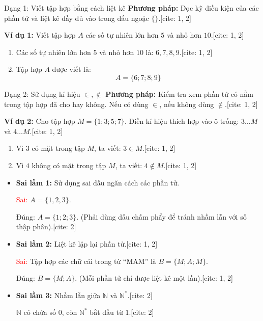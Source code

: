 \documentclass[12pt,a4paper]{article}
\begin{document}
\begin{vidubox}{Dạng 1: Viết tập hợp bằng cách liệt kê}
\textbf{Phương pháp:} Đọc kỹ điều kiện của các phần tử và liệt kê đầy đủ vào trong dấu ngoặc $\{ \}$.[cite: 1, 2]

\textbf{Ví dụ 1:} Viết tập hợp $A$ các số tự nhiên lớn hơn $5$ và nhỏ hơn $10$.[cite: 1, 2]
\begin{enumerate}
    \item Các số tự nhiên lớn hơn $5$ và nhỏ hơn $10$ là: $6, 7, 8, 9$.[cite: 1, 2]
    \item Tập hợp $A$ được viết là:
    $$A = \{6; 7; 8; 9\}$$
\end{enumerate}
\end{vidubox}

\begin{vidubox}{Dạng 2: Sử dụng kí hiệu $\in, \notin$}
\textbf{Phương pháp:} Kiểm tra xem phần tử có nằm trong tập hợp đã cho hay không. Nếu có dùng $\in$, nếu không dùng $\notin$.[cite: 1, 2]

\textbf{Ví dụ 2:} Cho tập hợp $M = \{1; 3; 5; 7\}$. Điền kí hiệu thích hợp vào ô trống: $3 \dots M$ và $4 \dots M$.[cite: 1, 2]
\begin{enumerate}
    \item Vì $3$ có mặt trong tập $M$, ta viết: $3 \in M$.[cite: 1, 2]
    \item Vì $4$ không có mặt trong tập $M$, ta viết: $4 \notin M$.[cite: 1, 2]
\end{enumerate}
\end{vidubox}

\begin{luuybox}
\begin{itemize}
    \item \textbf{Sai lầm 1:} Sử dụng sai dấu ngăn cách các phần tử.
    \par \textcolor{red}{Sai:} $A = \{1, 2, 3\}$.
    \par \textcolor{vidu}{Đúng:} $A = \{1; 2; 3\}$. (Phải dùng dấu chấm phẩy để tránh nhầm lẫn với số thập phân).[cite: 2]
    \item \textbf{Sai lầm 2:} Liệt kê lặp lại phần tử.[cite: 1, 2]
    \par \textcolor{red}{Sai:} Tập hợp các chữ cái trong từ ``MAM'' là $B = \{M; A; M\}$.
    \par \textcolor{vidu}{Đúng:} $B = \{M; A\}$. (Mỗi phần tử chỉ được liệt kê một lần).[cite: 1, 2]
    \item \textbf{Sai lầm 3:} Nhầm lẫn giữa $\mathbb{N}$ và $\mathbb{N}^*$.[cite: 2]
    \par $\mathbb{N}$ có chứa số $0$, còn $\mathbb{N}^*$ bắt đầu từ $1$.[cite: 2]
\end{itemize}
\end{luuybox}
\end{document}

